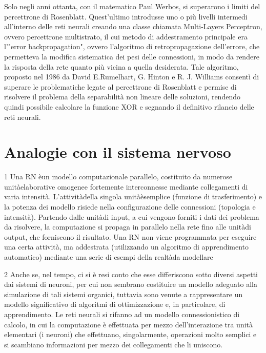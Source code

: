 \documentclass[12pt,a4paper,oneside]{book}
\begin{document}
		Solo negli anni ottanta, con il matematico Paul Werbos, si superarono i limiti del percettrone di Rosenblatt.  Quest'ultimo introdusse uno o più livelli intermedi all'interno delle reti neurali creando una classe chiamata  Multi-Layers Perceptron, ovvero percettrone multistrato, il cui metodo di addestramento principale era l'"error backpropagation", ovvero l'algoritmo di retropropagazione dell'errore, che permetteva la modifica sistematica dei pesi delle connessioni, in modo da rendere la risposta della rete quanto più vicina a quella desiderata.
		Tale algoritmo, proposto nel 1986 da David E.Rumelhart, G. Hinton e R. J. Williams consentì di superare le problematiche legate al percettrone di Rosenblatt e permise di risolvere il problema della separabilità non lineare delle soluzioni, rendendo quindi possibile calcolare la funzione XOR e segnando il definitivo rilancio delle reti neurali.
		
		
		\section{Analogie con il sistema nervoso}
	
	
		1 Una RN èun modello computazionale parallelo, costituito da numerose unitàelaborative omogenee fortemente interconnesse mediante collegamenti di varia intensità.
		L'attivitàdella singola unitàèsemplice (funzione di trasferimento) e la potenza dei modello risiede nella configurazione delle connessioni (topologia e intensità).
		Partendo dalle unitàdi input, a cui vengono forniti i dati dei problema da risolvere, la computazione si propaga in parallelo nella rete fino alle unitàdi output, che forniscono il risultato.
		Una RN non viene programmata per eseguire una certa attività, ma addestrata (utilizzando un algoritmo di apprendimento automatico) mediante una serie di esempi della realtàda modellare
		
		2 Anche se, nel tempo, ci si è resi conto che esse diﬀeriscono sotto diversi aspetti dai sistemi di neuroni, per cui non sembrano costituire un modello adeguato alla simulazione di tali sistemi organici, tuttavia sono venute a rappresentare un modello signiﬁcativo di algoritmi di ottimizzazione e, in particolare, di apprendimento. Le reti neurali si rifanno ad un modello connessionistico di calcolo, in cui la computazione è eﬀettuata per mezzo dell’interazione tra unità elementari (i neuroni) che eﬀettuano, singolarmente, operazioni molto semplici e si scambiano informazioni per mezzo dei collegamenti che li uniscono.
		
\end{document}
